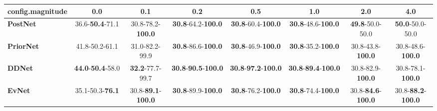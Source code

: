 \begin{tabular}{lccccccc}
\toprule
\textbf{config.magnitude} &                               0.0 &                                0.1 &                                         0.2 &                                         0.5 &                                         1.0 &                                2.0 &                                4.0 \\
\midrule
\textbf{PostNet } &           36.6-\textbf{50.4}-71.1 &           30.8-78.2-\textbf{100.0} &           \textbf{30.8}-64.2-\textbf{100.0} &           \textbf{30.8}-60.4-\textbf{100.0} &           \textbf{30.8}-48.6-\textbf{100.0} &            \textbf{49.8}-50.0-50.0 &            \textbf{50.0}-50.0-50.0 \\
\textbf{PriorNet} &                    41.8-50.2-61.1 &                     31.0-82.2-99.9 &           \textbf{30.8}-86.6-\textbf{100.0} &           \textbf{30.8}-46.9-\textbf{100.0} &           \textbf{30.8}-35.2-\textbf{100.0} &           30.8-43.8-\textbf{100.0} &           30.8-48.6-\textbf{100.0} \\
\textbf{DDNet   } &  \textbf{44.0}-\textbf{50.4}-58.0 &            \textbf{32.2}-77.7-99.7 &  \textbf{30.8}-\textbf{90.5}-\textbf{100.0} &  \textbf{30.8}-\textbf{97.2}-\textbf{100.0} &  \textbf{30.8}-\textbf{89.4}-\textbf{100.0} &           30.8-82.9-\textbf{100.0} &           30.8-78.1-\textbf{100.0} \\
\textbf{EvNet   } &           35.1-50.3-\textbf{76.1} &  30.8-\textbf{89.1}-\textbf{100.0} &           \textbf{30.8}-89.9-\textbf{100.0} &           \textbf{30.8}-76.2-\textbf{100.0} &           \textbf{30.8}-74.4-\textbf{100.0} &  30.8-\textbf{84.6}-\textbf{100.0} &  30.8-\textbf{88.2}-\textbf{100.0} \\
\bottomrule
\end{tabular}
